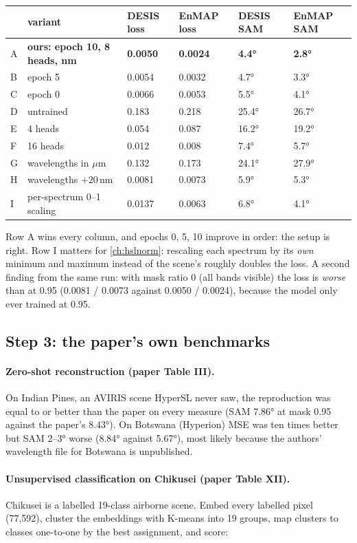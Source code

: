 \begin{center}\small
\begin{tabular}{@{}llllll@{}}
\toprule
& variant & DESIS loss & EnMAP loss & DESIS SAM & EnMAP SAM \\
\midrule
A & \textbf{ours: epoch 10, 8 heads, nm} & \textbf{0.0050} & \textbf{0.0024} & \textbf{4.4°} & \textbf{2.8°} \\
B & epoch 5 & 0.0054 & 0.0032 & 4.7° & 3.3° \\
C & epoch 0 & 0.0066 & 0.0053 & 5.5° & 4.1° \\
D & untrained & 0.183 & 0.218 & 25.4° & 26.7° \\
E & 4 heads & 0.054 & 0.087 & 16.2° & 19.2° \\
F & 16 heads & 0.012 & 0.008 & 7.4° & 5.7° \\
G & wavelengths in $\mu$m & 0.132 & 0.173 & 24.1° & 27.9° \\
H & wavelengths $+20$\,nm & 0.0081 & 0.0073 & 5.9° & 5.3° \\
I & per-spectrum 0--1 scaling & 0.0137 & 0.0063 & 6.8° & 4.1° \\
\bottomrule
\end{tabular}
\end{center}
Row A wins every column, and epochs 0, 5, 10 improve in order: the setup is right. Row I matters for
\cref{ch:hslnorm}: rescaling each spectrum by its \emph{own} minimum and maximum instead of the scene's roughly doubles
the loss. A second finding from the same run: with mask ratio 0 (all bands visible) the loss is \emph{worse} than at
0.95 (0.0081 / 0.0073 against 0.0050 / 0.0024), because the model only ever trained at 0.95.

\subsection{Step 3: the paper's own benchmarks}

\paragraph{Zero-shot reconstruction (paper Table III).} On Indian Pines, an AVIRIS scene HyperSL never saw, the
reproduction was equal to or better than the paper on every measure (SAM 7.86° at mask 0.95 against the paper's
8.43°). On Botswana (Hyperion) MSE was ten times better but SAM 2--3° worse (8.84° against 5.67°), most likely
because the authors' wavelength file for Botswana is unpublished.

\paragraph{Unsupervised classification on Chikusei (paper Table XII).} Chikusei is a labelled 19-class airborne scene.
Embed every labelled pixel (77,592), cluster the embeddings with K-means into 19 groups, map clusters to classes
one-to-one by the best assignment, and score:

